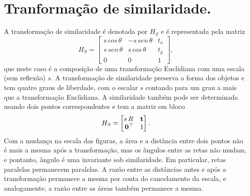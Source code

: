 \section*{Tranformação de similaridade.}
A transformação de similaridade é denotada por $H_S$ e é representada pela matriz 
\begin{equation*}
H_S=
\begin{bmatrix}
s\,cos\,\theta&-s\,sen\,\theta&t_x\\
s\,sen\,\theta&s\,cos\,\theta&t_y\\
0&0&1
\end{bmatrix},
\end{equation*} 
que neste caso é a composição de uma transformação Euclidiana com uma escala (sem reflexão) $s$. A transformação de similaridade preserva a forma dos objetos e tem quatro graus de liberdade, com o escalar $s$ contando para um grau a mais que a transformação Euclidiana. A similaridade também pode ser determinada usando dois pontos correspondentes e tem a matriz em bloco
\begin{equation*}
H_S=
\begin{bmatrix}
s\,R&{\bf t}\\
\,{\bf 0}^\top&1
\end{bmatrix}.
\end{equation*}
Com a mudança na escala das figuras, a área e a distância entre dois pontos não é mais a mesma após a transformação, mas os ângulos entre as retas não mudam, e pontanto, ângulo é uma invariante sob similaridade. Em particular, retas paralelas permanecem paralelas. A razão entre as distâncias antes e após a transformação permanece a mesma por conta do cancelamento da escala, e analogamente, a razão entre as áreas também permanece a mesma.
